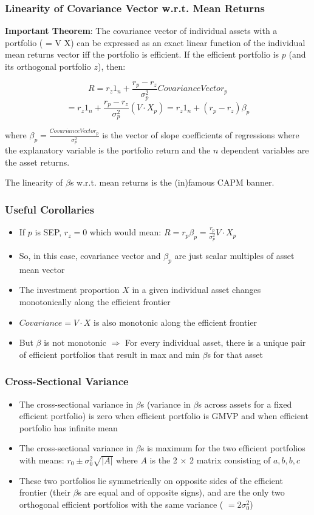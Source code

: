 \documentclass{beamer}
\begin{document}
\begin{frame}
\frametitle{Linearity of Covariance Vector w.r.t. Mean Returns}

{\bf Important Theorem}: The covariance vector of individual assets with a portfolio ( = V X) can be expressed as an exact linear function of the individual mean returns vector iff the portfolio is efficient. If the efficient portfolio is $p$ (and its orthogonal portfolio $z$), then:

$$R = r_z 1_n + \frac {r_p - r_z} {\sigma_p^2} CovarianceVector_p$$
$$ = r_z 1_n + \frac {r_p - r_z} {\sigma_p^2} (V \cdot X_p) = r_z 1_n +  (r_p - r_z) \beta_p$$

where $\beta_p = \frac {CovarianceVector_p} {\sigma_p^2}$ is the vector of slope coefficients of regressions where the explanatory variable is the portfolio return and the $n$ dependent variables are the asset returns.

The linearity of $\beta$s w.r.t. mean returns is the (in)famous CAPM banner.
\end{frame}

\begin{frame}
\frametitle{Useful Corollaries}
\begin{itemize}
\item If $p$ is SEP, $r_z = 0$ which would mean: $R = r_p \beta_p = \frac {r_p} {\sigma_p^2} V \cdot X_p$
\item So, in this case, covariance vector and $\beta_p$ are just scalar multiples of asset mean vector
\item The investment proportion $X$ in a given individual asset changes monotonically along the efficient frontier
\item $Covariance = V \cdot X$ is also monotonic along the efficient frontier
\item But $\beta$ is not monotonic $\Rightarrow$ For every individual asset, there is a unique pair of efficient portfolios that result in max and min $\beta$s for that asset
\end{itemize}
\end{frame}

\begin{frame}
\frametitle{Cross-Sectional Variance}
\begin{itemize}
\item The cross-sectional variance in $\beta$s (variance in $\beta$s across assets for a fixed efficient portfolio) is zero when efficient portfolio is GMVP and when efficient portfolio has infinite mean
\item The cross-sectional variance in $\beta$s is maximum for the two efficient portfolios with means: $ r_0 \pm \sigma_0^2 \sqrt{|A|}$ where $A$ is the 2 $\times$ 2 matrix consisting of $a,b,b,c$
\item These two portfolios lie symmetrically on opposite sides of the efficient frontier (their $\beta$s are equal and of opposite signs), and are the only two orthogonal efficient portfolios with the same variance ( $= 2 \sigma_0^2$)
\end{itemize}
\end{frame}
\end{document}
